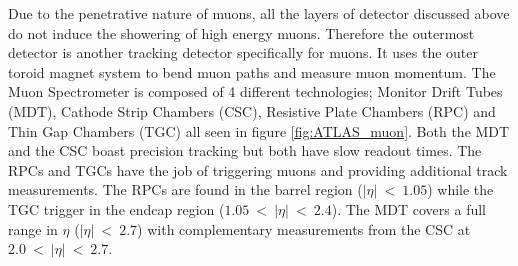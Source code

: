 		Due to the penetrative nature of muons, all the layers of detector discussed above do not induce the showering of high energy muons. Therefore the outermost detector is another tracking detector specifically for muons. It uses the outer toroid magnet system to bend muon paths and measure muon momentum. The Muon Spectrometer is composed of 4 different technologies; Monitor Drift Tubes (MDT), Cathode Strip Chambers (CSC), Resistive Plate Chambers (RPC) and Thin Gap Chambers (TGC) all seen in figure \ref{fig:ATLAS_muon}. Both the MDT and the CSC boast precision tracking but both have slow readout times. The RPCs and TGCs have the job of triggering muons and providing additional track measurements. The RPCs are found in the barrel region ($|\eta|~<~1.05$) while the TGC trigger in the endcap region ($1.05~<~|\eta|~<~2.4$). The MDT covers a full range in $\eta$ ($|\eta|~<~2.7$) with complementary measurements from the CSC at $2.0~<~|\eta|~<~2.7$.






